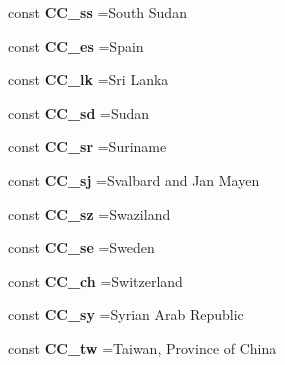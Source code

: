 \begin{DoxyCompactItemize}
\item 
\hypertarget{class_i_s_o_aedb2b8e4990a1550fb1e31dea9cd34aa}{}\label{class_i_s_o_aedb2b8e4990a1550fb1e31dea9cd34aa} 
const {\bfseries C\+C\+\_\+ss} =\textquotesingle{}South Sudan\textquotesingle{}
\item 
\hypertarget{class_i_s_o_a3a62c11621028a9214949428b67d02ae}{}\label{class_i_s_o_a3a62c11621028a9214949428b67d02ae} 
const {\bfseries C\+C\+\_\+es} =\textquotesingle{}Spain\textquotesingle{}
\item 
\hypertarget{class_i_s_o_aa4a7541c0e01b1133a458f2fcb49ba9f}{}\label{class_i_s_o_aa4a7541c0e01b1133a458f2fcb49ba9f} 
const {\bfseries C\+C\+\_\+lk} =\textquotesingle{}Sri Lanka\textquotesingle{}
\item 
\hypertarget{class_i_s_o_abc8104dc2a1dba7e89c6fa2ba6fb82c0}{}\label{class_i_s_o_abc8104dc2a1dba7e89c6fa2ba6fb82c0} 
const {\bfseries C\+C\+\_\+sd} =\textquotesingle{}Sudan\textquotesingle{}
\item 
\hypertarget{class_i_s_o_aabf63582508c4616d66d1155f4d57850}{}\label{class_i_s_o_aabf63582508c4616d66d1155f4d57850} 
const {\bfseries C\+C\+\_\+sr} =\textquotesingle{}Suriname\textquotesingle{}
\item 
\hypertarget{class_i_s_o_af92da4e5f6e56d4e3a2e580a9b2f1c48}{}\label{class_i_s_o_af92da4e5f6e56d4e3a2e580a9b2f1c48} 
const {\bfseries C\+C\+\_\+sj} =\textquotesingle{}Svalbard and Jan Mayen\textquotesingle{}
\item 
\hypertarget{class_i_s_o_a3f53e50dd344c7bff28bf4bf3475c7d6}{}\label{class_i_s_o_a3f53e50dd344c7bff28bf4bf3475c7d6} 
const {\bfseries C\+C\+\_\+sz} =\textquotesingle{}Swaziland\textquotesingle{}
\item 
\hypertarget{class_i_s_o_a6ed8349a33cfe230bf7de2cc3ce5880a}{}\label{class_i_s_o_a6ed8349a33cfe230bf7de2cc3ce5880a} 
const {\bfseries C\+C\+\_\+se} =\textquotesingle{}Sweden\textquotesingle{}
\item 
\hypertarget{class_i_s_o_a8f639883594fcf023a7932406ac5881d}{}\label{class_i_s_o_a8f639883594fcf023a7932406ac5881d} 
const {\bfseries C\+C\+\_\+ch} =\textquotesingle{}Switzerland\textquotesingle{}
\item 
\hypertarget{class_i_s_o_ac0a0314fa4e6a007de286b84379d5e75}{}\label{class_i_s_o_ac0a0314fa4e6a007de286b84379d5e75} 
const {\bfseries C\+C\+\_\+sy} =\textquotesingle{}Syrian Arab Republic\textquotesingle{}
\item 
\hypertarget{class_i_s_o_a87ba1f7aec240cabade1f807d161ea5a}{}\label{class_i_s_o_a87ba1f7aec240cabade1f807d161ea5a} 
const {\bfseries C\+C\+\_\+tw} =\textquotesingle{}Taiwan, Province of China\textquotesingle{}

\end{DoxyCompactItemize}
